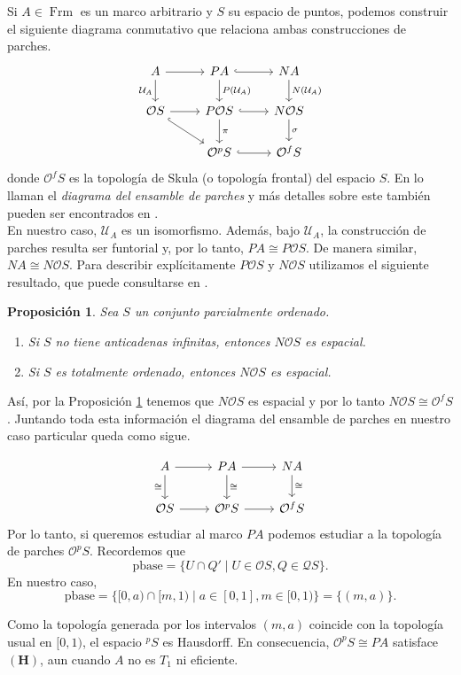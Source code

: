 \documentclass[12pt]{article}
\newtheorem{prop}[thm]{Proposición}
\DeclareMathOperator{\Frm}{Frm}
\begin{document}
Si $A\in\Frm$ es un marco arbitrario y $S$ su espacio de puntos, podemos construir el siguiente diagrama conmutativo que relaciona ambas construcciones de parches.
\[\begin{tikzcd}
	A & PA & NA \\
	{\mathcal{O}S} & {P\mathcal{O}S} & {N\mathcal{O}S} \\
	& {\mathcal{O}^pS} & {\mathcal{O}^fS}
	\arrow[from=1-1, to=1-2]
	\arrow["{\mathcal{U}_A}"', from=1-1, to=2-1]
	\arrow[hook, from=1-2, to=1-3]
	\arrow["{P(\mathcal{U}_A)}", from=1-2, to=2-2]
	\arrow["{N(\mathcal{U}_A)}", from=1-3, to=2-3]
	\arrow[from=2-1, to=2-2]
	\arrow[hook, from=2-1, to=3-2]
	\arrow[hook, from=2-2, to=2-3]
	\arrow["\pi", from=2-2, to=3-2]
	\arrow["\sigma", from=2-3, to=3-3]
	\arrow[hook, from=3-2, to=3-3]
\end{tikzcd}\]
donde $\mathcal{O}^fS$ es la topología de Skula (o topología frontal) del espacio $S$. En \cite{sexton2006point} lo llaman el 
\emph{diagrama del ensamble de parches} y más detalles sobre este también pueden ser encontrados
en \cite{sexton2003point}.\\

En nuestro caso, $\mathcal{U}_A$ es un isomorfismo. Además, bajo $\mathcal{U}_A$, la construcción de parches resulta ser funtorial y, por lo tanto,
$PA\cong P\mathcal{O}S$. De manera similar, $NA\cong N\mathcal{O}S$.
Para describir explícitamente $P\mathcal{O}S$ y $N\mathcal{O}S$ utilizamos el siguiente resultado, que puede consultarse en \cite{AvilaBezhaniMorandiZaldivar2020}.

\begin{prop}\label{Ensamble espacial}
Sea $S$ un conjunto parcialmente ordenado.
\begin{enumerate}
  \item Si $S$ no tiene anticadenas infinitas, entonces $N\mathcal{O}S$ es espacial.
  \item Si $S$ es totalmente ordenado, entonces $N\mathcal{O}S$ es espacial.
\end{enumerate}
\end{prop}

Así, por la Proposición \ref{Ensamble espacial} tenemos que $N\mathcal{O}S$ es espacial y por lo tanto $N\mathcal{O}S\cong \mathcal{O}^fS$. Juntando toda esta información 
el diagrama del ensamble de parches en nuestro caso particular queda como sigue.

\[\begin{tikzcd}
	A & PA & NA \\
	{\mathcal{O}S} & {\mathcal{O}^pS} & {\mathcal{O}^fS}
	\arrow[from=1-1, to=1-2]
	\arrow["\cong"', from=1-1, to=2-1]
	\arrow[from=1-2, to=1-3]
	\arrow["\cong", from=1-2, to=2-2]
	\arrow["\cong", from=1-3, to=2-3]
	\arrow[from=2-1, to=2-2]
	\arrow[from=2-2, to=2-3]
\end{tikzcd}\]
Por lo tanto, si queremos estudiar al marco $PA$ podemos estudiar a la topología de parches $\mathcal{O}^pS$. Recordemos que 
\[
\text{pbase}=\{U\cap Q'\mid U\in \mathcal{O}S, Q\in \mathcal{Q}S\}.
\]
En nuestro caso,
\[
\text{pbase}=\{[0, a)\cap [m, 1)\mid a\in [0,1], m\in [0,1)\}=\{(m,a)\}.
\]

Como la topología generada por los intervalos $(m,a)$ coincide con la topología usual en $[0,1)$, el espacio $^pS$ es Hausdorff. En consecuencia, $\mathcal{O}^pS\cong PA$ satisface $\mathbf{(H)}$, aun cuando $A$ no es $T_1$ ni eficiente.



\end{document}
